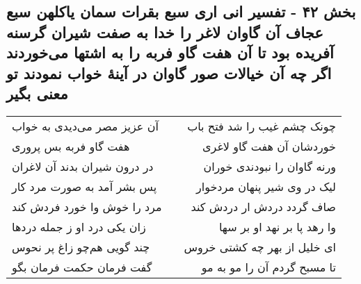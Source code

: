 \begin{center}
\section*{بخش ۴۲ - تفسیر انی اری سبع بقرات سمان یاکلهن سبع عجاف آن گاوان لاغر را خدا به صفت شیران گرسنه آفریده  بود تا آن هفت گاو فربه را  به اشتها می‌خوردند اگر چه  آن خیالات صور گاوان در آینهٔ خواب نمودند تو معنی بگیر}
\label{sec:sh042}
\begin{longtable}{l p{0.5cm} r}
آن عزیز مصر می‌دیدی به خواب
&&
چونک چشم غیب را شد فتح باب
\\
هفت گاو فربه بس پروری
&&
خوردشان آن هفت گاو لاغری
\\
در درون شیران بدند آن لاغران
&&
ورنه گاوان را نبودندی خوران
\\
پس بشر آمد به صورت مرد کار
&&
لیک در وی شیر پنهان مردخوار
\\
مرد را خوش وا خورد فردش کند
&&
صاف گردد دردش ار دردش کند
\\
زان یکی درد او ز جمله دردها
&&
وا رهد پا بر نهد او بر سها
\\
چند گویی هم‌چو زاغ پر نحوس
&&
ای خلیل از بهر چه کشتی خروس
\\
گفت فرمان حکمت فرمان بگو
&&
تا مسبح گردم آن را مو به مو
\\
\end{longtable}
\end{center}

